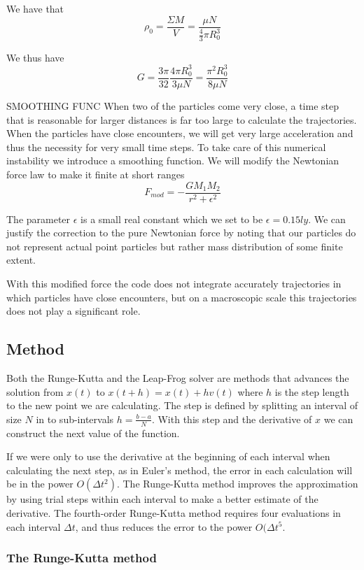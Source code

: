 \documentclass[a4paper,12pt, english]{article}
\begin{document}
We have that 
\[
\rho_0 = \frac{\Sigma M}{V} = \frac{\mu N}{ \frac{4}{3} \pi R_0^3} 
\]

We thus have
\[
G = \frac{3 \pi}{32} \frac{4 \pi R_0^3}{3 \mu N} = \frac{\pi^2 R_0^ 3}{8 \mu N}
\]


SMOOTHING FUNC
When two of the particles come very close, a time step that is reasonable for larger distances is far too large to calculate the trajectories. When the particles have close encounters, we will get very large acceleration and thus the necessity for very small time steps. To take care of this numerical instability we introduce a smoothing function. We will modify the Newtonian force law to make it finite at short ranges
\[
F_{mod} = - \frac{GM_1M_2}{r^2 + \epsilon^2}
\]

The parameter $\epsilon$ is a small real constant which we set to be $\epsilon = 0.15 ly$. We can justify the correction to the pure Newtonian force by noting that our particles do not represent actual point particles but rather mass distribution of some finite extent. 

With this modified force the code does not integrate accurately trajectories in which particles have close encounters, but on a macroscopic scale this trajectories does not play a significant role.  
  
\subsection*{Method}

Both the Runge-Kutta and the Leap-Frog solver are methods that advances the solution from $x(t)$ to $x(t+h) = x(t) + hv(t)$ where $h$ is the step length to the new point we are calculating. The step is defined by splitting an interval of size $N$ in to sub-intervals $h = \frac{b-a}{N}$. With this step and the derivative of $x$ we can construct the next value of the function. 

If we were only to use the derivative at the beginning of each interval when calculating the next step, as in Euler's method, the error in each calculation will be in the power $O(\Delta t^2)$. The Runge-Kutta method improves the approximation by using trial steps within each interval to make a better estimate of the derivative. The fourth-order Runge-Kutta method requires four evaluations in each interval $\Delta t$, and thus reduces the error to the power $O(\Delta t^5$.  

 
\subsubsection*{The Runge-Kutta method}
\end{document}
